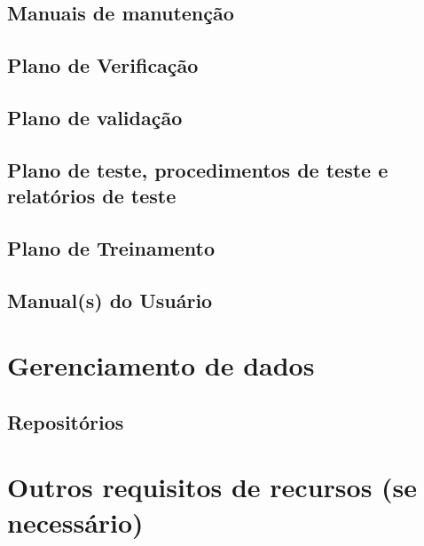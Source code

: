 \subsection{Manuais de manutenção}

\subsection{Plano de Verificação}

\subsection{Plano de validação}

\subsection{Plano de teste, procedimentos de teste e relatórios de teste}

\subsection{Plano de Treinamento}

\subsection{Manual(s) do Usuário}

\section{Gerenciamento de dados}

\subsection{Repositórios}

\section{Outros requisitos de recursos (se necessário)}
